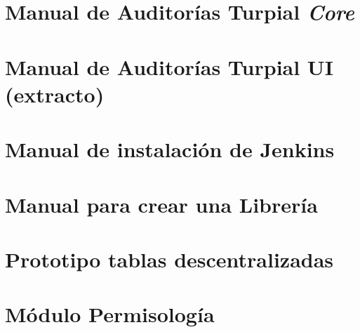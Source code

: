 \documentclass[onehalfspace]{USB}
\begin{document}
\chapter{Manual de Auditorías Turpial \textit{Core}}


\chapter{Manual de Auditorías Turpial UI (extracto)}


\chapter{Manual de instalación de Jenkins}


\chapter{Manual para crear una Librería}


\chapter{Prototipo tablas descentralizadas}


\chapter{Módulo Permisología}



\end{document}
